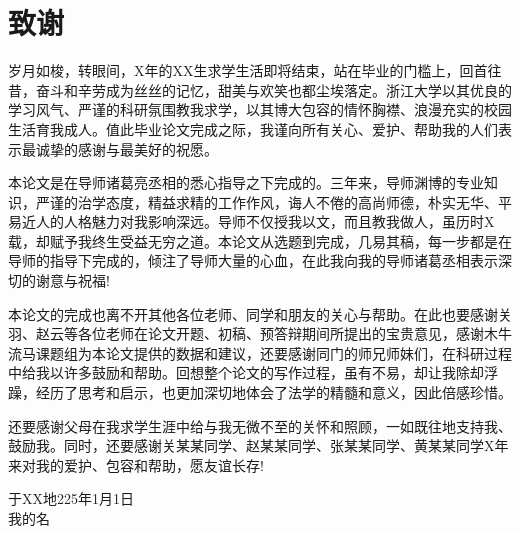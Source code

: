 \chapter{致\ZJUspace 谢}
岁月如梭，转眼间，X年的XX生求学生活即将结束，站在毕业的门槛上，回首往昔，奋斗和辛劳成为丝丝的记忆，甜美与欢笑也都尘埃落定。浙江大学以其优良的学习风气、严谨的科研氛围教我求学，以其博大包容的情怀胸襟、浪漫充实的校园生活育我成人。值此毕业论文完成之际，我谨向所有关心、爱护、帮助我的人们表示最诚挚的感谢与最美好的祝愿。

本论文是在导师诸葛亮丞相的悉心指导之下完成的。三年来，导师渊博的专业知识，严谨的治学态度，精益求精的工作作风，诲人不倦的高尚师德，朴实无华、平易近人的人格魅力对我影响深远。导师不仅授我以文，而且教我做人，虽历时X载，却赋予我终生受益无穷之道。本论文从选题到完成，几易其稿，每一步都是在导师的指导下完成的，倾注了导师大量的心血，在此我向我的导师诸葛丞相表示深切的谢意与祝福!

本论文的完成也离不开其他各位老师、同学和朋友的关心与帮助。在此也要感谢关羽、赵云等各位老师在论文开题、初稿、预答辩期间所提出的宝贵意见，感谢木牛流马课题组为本论文提供的数据和建议，还要感谢同门的师兄师妹们，在科研过程中给我以许多鼓励和帮助。回想整个论文的写作过程，虽有不易，却让我除却浮躁，经历了思考和启示，也更加深切地体会了法学的精髓和意义，因此倍感珍惜。

还要感谢父母在我求学生涯中给与我无微不至的关怀和照顾，一如既往地支持我、鼓励我。同时，还要感谢关某某同学、赵某某同学、张某某同学、黄某某同学X年来对我的爱护、包容和帮助，愿友谊长存!

\vspace{2cm}
\hfill
\begin{minipage}{14em}
\begin{center}
于XX地\quad 225年1月1日\\
我的名
\end{center}
\end{minipage}
